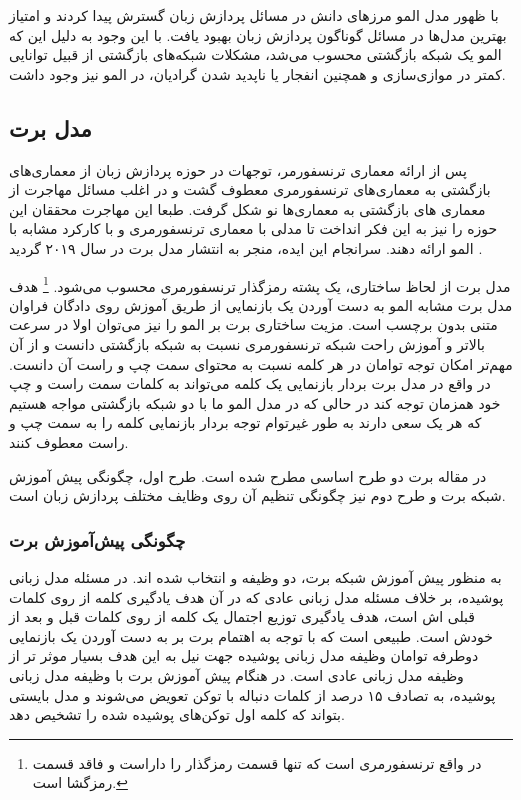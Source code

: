  با ظهور مدل المو مرز‌های دانش در مسائل پردازش زبان گسترش پیدا کردند و امتیاز بهترین مدل‌ها در مسائل گوناگون پردازش زبان بهبود یافت. با این وجود به دلیل این که المو یک شبکه بازگشتی محسوب می‌شد، مشکلات شبکه‌های بازگشتی از قبیل توانایی کمتر در موازی‌سازی و همچنین انفجار یا ناپدید شدن گرادیان، در المو نیز وجود داشت.  

\subsection{مدل برت}
پس از ارائه معماری ترنسفورمر، توجهات در حوزه پردازش زبان از معماری‌های بازگشتی به معماری‌های ترنسفورمری معطوف گشت و در اغلب مسائل مهاجرت از معماری های بازگشتی به معماری‌‌ها نو شکل گرفت. 
طبعا این مهاجرت محققان این حوزه را نیز به این فکر انداخت تا مدلی با معماری ترنسفورمری و با کارکرد مشابه با المو ارائه دهند. سرانجام این ایده، منجر به انتشار مدل برت در سال ۲۰۱۹ گردید
\cite{bert}
.

مدل برت از لحاظ ساختاری، یک پشته رمزگذار ترنسفورمری محسوب می‌شود. 
\footnote{در واقع ترنسفورمری است که تنها قسمت رمزگذار را داراست و فاقد قسمت رمزگشا است.}
هدف مدل برت مشابه المو به دست آوردن یک بازنمایی از طریق آموزش روی دادگان فراوان متنی بدون برچسب است. مزیت ساختاری برت بر المو را نیز می‌توان اولا در سرعت بالاتر و آموزش راحت شبکه‌ ترنسفورمری نسبت به شبکه بازگشتی دانست و از آن مهم‌تر امکان توجه توامان
 در هر کلمه نسبت به محتوای سمت چپ و راست آن دانست. در واقع در مدل برت بردار بازنمایی یک کلمه می‌تواند به کلمات سمت راست و چپ خود همزمان توجه کند در حالی که در مدل المو ما با دو شبکه بازگشتی مواجه هستیم که هر یک سعی دارند به طور غیرتوام توجه بردار بازنمایی کلمه را به سمت چپ و راست معطوف کنند. 
 
 در مقاله برت دو طرح اساسی مطرح شده است. طرح اول، چگونگی پیش آموزش شبکه برت و طرح دوم نیز چگونگی تنظیم آن روی وظایف مختلف پردازش زبان است.
 
 \subsubsection{چگونگی پیش‌آموزش برت}
 به منظور پیش آموزش شبکه برت، دو وظیفه 
 و 
 انتخاب شده اند.
در مسئله مدل زبانی پوشیده، بر خلاف مسئله مدل زبانی عادی که در آن هدف یادگیری
کلمه از روی کلمات قبلی اش است، هدف یادگیری توزیع اجتمال یک کلمه از روی کلمات قبل و بعد از خودش است. طبیعی است که با توجه به اهتمام برت بر به دست آوردن یک بازنمایی دوطرفه توامان وظیفه مدل زبانی پوشیده جهت نیل به این هدف بسیار موثر تر از وظیفه مدل زبانی عادی است. در هنگام پیش آموزش برت با وظیفه مدل زبانی پوشیده، به تصادف ۱۵ درصد از کلمات دنباله با توکن 
تعویض می‌شوند و مدل بایستی بتواند که کلمه اول توکن‌های پوشیده شده را تشخیص دهد. 

